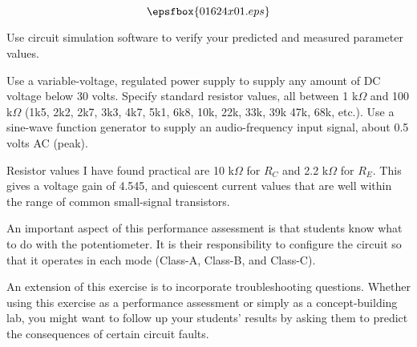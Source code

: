 

$$\epsfbox{01624x01.eps}$$

\vfil \eject






Use circuit simulation software to verify your predicted and measured parameter values.







Use a variable-voltage, regulated power supply to supply any amount of DC voltage below 30 volts.  Specify standard resistor values, all between 1 k$\Omega$ and 100 k$\Omega$ (1k5, 2k2, 2k7, 3k3, 4k7, 5k1, 6k8, 10k, 22k, 33k, 39k 47k, 68k, etc.).  Use a sine-wave function generator to supply an audio-frequency input signal, about 0.5 volts AC (peak).

Resistor values I have found practical are 10 k$\Omega$ for $R_C$ and 2.2 k$\Omega$ for $R_E$.  This gives a voltage gain of 4.545, and quiescent current values that are well within the range of common small-signal transistors.

An important aspect of this performance assessment is that students know what to do with the potentiometer.  It is their responsibility to configure the circuit so that it operates in each mode (Class-A, Class-B, and Class-C).

An extension of this exercise is to incorporate troubleshooting questions.  Whether using this exercise as a performance assessment or simply as a concept-building lab, you might want to follow up your students' results by asking them to predict the consequences of certain circuit faults.




